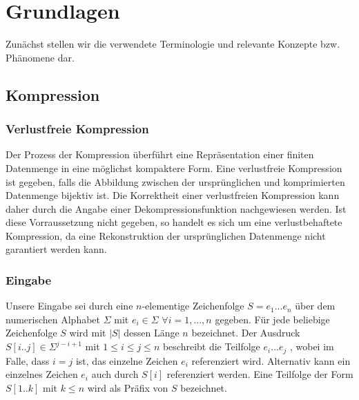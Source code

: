 \chapter{Grundlagen}

Zunächst stellen wir die verwendete Terminologie und relevante Konzepte bzw. Phänomene dar.

\section{Kompression} \label{comp}

\subsection{Verlustfreie Kompression}
Der Prozess der Kompression überführt eine Repräsentation einer finiten Datenmenge in eine möglichst kompaktere Form. Eine verlustfreie Kompression ist gegeben, falls die Abbildung
zwischen der ursprünglichen und komprimierten Datenmenge bijektiv ist. Die Korrektheit einer verlustfreien Kompression kann daher durch die Angabe einer Dekompressionsfunktion nachgewiesen werden.
Ist diese Vorraussetzung nicht gegeben, so handelt es sich um eine verlustbehaftete Kompression, da eine Rekonstruktion der ursprünglichen Datenmenge nicht garantiert werden kann.

\subsection{Eingabe}
Unsere Eingabe sei durch eine $n$-elementige Zeichenfolge $S=e_1...e_n$ über dem numerischen Alphabet $\Sigma$ mit $e_i\in \Sigma$ $\forall i=1,...,n$ gegeben. Für jede
beliebige Zeichenfolge $S$ wird mit $|S|$ dessen Länge $n$ bezeichnet. Der Ausdruck $S[i..j]\in \Sigma^{j-i+1}$ mit $1\leq i\leq j\leq n$ beschreibt die Teilfolge $e_i...e_j$ , wobei im Falle, 
dass $i=j$ ist, das einzelne Zeichen $e_i$ referenziert wird. Alternativ kann ein einzelnes Zeichen $e_i$ auch durch $S[i]$ referenziert werden. Eine Teilfolge der Form 
$S[1..k]$ mit $k\leq n$ wird als Präfix von $S$ bezeichnet.